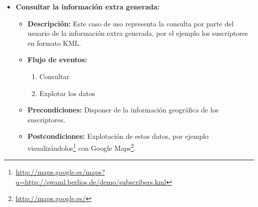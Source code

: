 \begin{itemize}
  \item \textbf{Consultar la información extra generada:}
 	\begin{itemize}
 	  \item \textbf{Descripción:} Este caso de uso representa la consulta 
		por parte del usuario de la información extra generada, por el 
		ejemplo los suscriptores en formato KML.
 	  \item \textbf{Flujo de eventos:}
		\begin{enumerate}
		 \item Consultar
		 \item Explotar los datos
		\end{enumerate}
	  \item \textbf{Precondiciones:} Disponer de la información geográfica 
		de los suscriptores.
	  \item \textbf{Postcondiciones:} Explotación de estos datos, por ejemplo
		visualizándolos\footnote{\url{http://maps.google.es/maps?q=http://swaml.berlios.de/demo/subscribers.kml}}
		con Google Maps\footnote{\url{http://maps.google.es/}}.
	\end{itemize}

\end{itemize}



